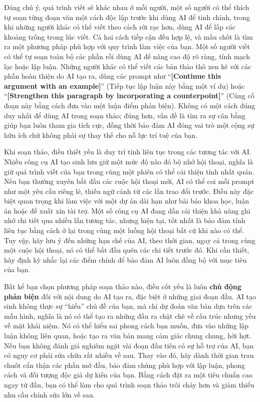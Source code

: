 Đáng chú ý, quá trình viết sẽ khác nhau ở mỗi người, một số người có thể thích tự soạn từng đoạn văn một cách độc lập trước khi dùng AI để tinh chỉnh, trong khi những người khác có thể viết theo cách rời rạc hơn, dùng AI để lấp các khoảng trống trong lúc viết. Cả hai cách tiếp cận đều hợp lệ, và mấu chốt là tìm ra một phương pháp phù hợp với quy trình làm việc của bạn. Một số người viết có thể tự soạn toàn bộ các phần rồi dùng AI để nâng cao độ rõ ràng, tính mạch lạc hoặc lập luận. Những người khác có thể viết các bản thảo thô xen kẽ với các phần hoàn thiện do AI tạo ra, dùng các prompt như ``\textbf{{[}Continue this argument with an example{]}}'' (Tiếp tục lập luận này bằng một ví dụ) hoặc ``\textbf{{[}Strengthen this paragraph by incorporating a counterpoint{]}}'' (Củng cố đoạn này bằng cách đưa vào một luận điểm phản biện). Không có một cách đúng duy nhất để dùng AI trong soạn thảo; đúng hơn, vấn đề là tìm ra sự cân bằng giúp bạn luôn tham gia tích cực, đồng thời bảo đảm AI đóng vai trò một cộng sự hữu ích chứ không phải sự thay thế cho nỗ lực trí tuệ của bạn.

Khi soạn thảo, điều thiết yếu là duy trì tính liên tục trong các tương tác với AI. Nhiều công cụ AI tạo sinh lưu giữ một mức độ nào đó bộ nhớ hội thoại, nghĩa là giữ quá trình viết của bạn trong cùng một phiên có thể cải thiện tính nhất quán. Nếu bạn thường xuyên bắt đầu các cuộc hội thoại mới, AI có thể coi mỗi prompt như một yêu cầu riêng lẻ, thiếu ngữ cảnh từ các lần trao đổi trước. Điều này đặc biệt quan trọng khi làm việc với một dự án dài hạn như bài báo khoa học, luận án hoặc đề xuất xin tài trợ. Một số công cụ AI đang dần cải thiện khả năng ghi nhớ chi tiết qua nhiều lần tương tác, nhưng hiện tại, tốt nhất là bảo đảm tính liên tục bằng cách ở lại trong cùng một luồng hội thoại bất cứ khi nào có thể. Tuy vậy, hãy lưu ý đến những hạn chế của AI, theo thời gian, ngay cả trong cùng một cuộc hội thoại, nó có thể bắt đầu quên các chi tiết trước đó. Khi cần thiết, hãy định kỳ nhắc lại các điểm chính để bảo đảm AI luôn đồng bộ với mục tiêu của bạn.

Bất kể bạn chọn phương pháp soạn thảo nào, điều cốt yếu là luôn \textbf{chủ động phản biện} đối với nội dung do AI tạo ra, đặc biệt ở những giai đoạn đầu. AI tạo sinh không thực sự ``hiểu'' chủ đề của bạn, mà chỉ dự đoán văn bản dựa trên các mẫu hình, nghĩa là nó có thể tạo ra những đầu ra chặt chẽ về cấu trúc nhưng yếu về mặt khái niệm. Nó có thể hiểu sai phong cách bạn muốn, đưa vào những lập luận không liên quan, hoặc tạo ra văn bản mang cảm giác chung chung, hời hợt. Nếu bạn không đánh giá nghiêm ngặt vài đoạn đầu tiên có sự hỗ trợ của AI, bạn có nguy cơ phải sửa chữa rất nhiều về sau. Thay vào đó, hãy dành thời gian trau chuốt cẩn thận các phần mở đầu, bảo đảm chúng phù hợp với lập luận, phong cách và đối tượng độc giả dự kiến của bạn. Bằng cách đặt ra một tiêu chuẩn cao ngay từ đầu, bạn có thể làm cho quá trình soạn thảo trôi chảy hơn và giảm thiểu nhu cầu chỉnh sửa lớn về sau.

